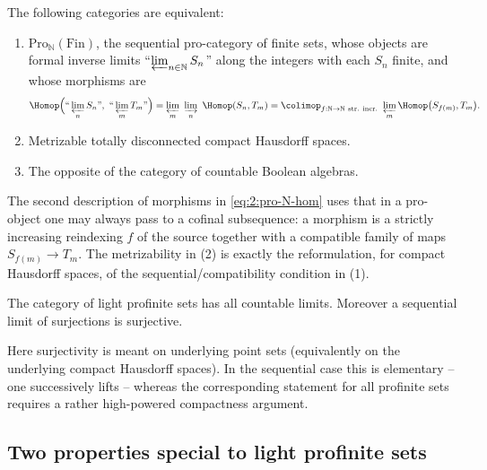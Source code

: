 \begin{proposition}
\label{prop:2:stone-duality-light}
The following categories are equivalent:
\begin{enumerate}
\item $\mathrm{Pro}_{\mathbb{N}}(\mathrm{Fin})$, the sequential pro-category of
finite sets, whose objects are formal inverse limits
``$\varprojlim_{n\in\mathbb{N}} S_n$'' along the integers with each $S_n$ finite,
and whose morphisms are
\begin{equation}
\label{eq:2:pro-N-hom}
\Homop\Bigl(\text{``}\varprojlim_n S_n\text{''},\
\text{``}\varprojlim_m T_m\text{''}\Bigr)
=\varprojlim_m\ \varinjlim_n\ \Homop(S_n,T_m)
=\colimop_{f:\mathbb{N}\to\mathbb{N}\ \mathrm{str.\ incr.}}\ \varprojlim_m
\Homop\bigl(S_{f(m)},T_m\bigr).
\end{equation}
\item Metrizable totally disconnected compact Hausdorff spaces.
\item The opposite of the category of countable Boolean algebras.
\end{enumerate}
\end{proposition}

The second description of morphisms in \eqref{eq:2:pro-N-hom} uses that in a
pro-object one may always pass to a cofinal subsequence: a morphism is a strictly
increasing reindexing $f$ of the source together with a compatible family of maps
$S_{f(m)}\to T_m$. The metrizability in (2) is exactly the reformulation, for
compact Hausdorff spaces, of the sequential/compatibility condition in (1).

\begin{proposition}
\label{prop:2:countable-limits}
The category of light profinite sets has all countable limits. Moreover a
sequential limit of surjections is surjective.
\end{proposition}

Here surjectivity is meant on underlying point sets (equivalently on the
underlying compact Hausdorff spaces). In the sequential case this is elementary
-- one successively lifts -- whereas the corresponding statement for all
profinite sets requires a rather high-powered compactness argument.

\subsection{Two properties special to light profinite sets}

